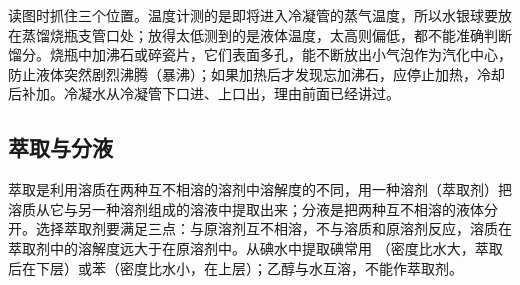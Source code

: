 读图时抓住三个位置。温度计测的是即将进入冷凝管的蒸气温度，所以水银球要放在蒸馏烧瓶支管口处；放得太低测到的是液体温度，太高则偏低，都不能准确判断馏分。烧瓶中加沸石或碎瓷片，它们表面多孔，能不断放出小气泡作为汽化中心，防止液体突然剧烈沸腾（暴沸）；如果加热后才发现忘加沸石，应停止加热，冷却后补加。冷凝水从冷凝管下口进、上口出，理由前面已经讲过。

\subsection{萃取与分液}

萃取是利用溶质在两种互不相溶的溶剂中溶解度的不同，用一种溶剂（萃取剂）把溶质从它与另一种溶剂组成的溶液中提取出来；分液是把两种互不相溶的液体分开。选择萃取剂要满足三点：与原溶剂互不相溶，不与溶质和原溶剂反应，溶质在萃取剂中的溶解度远大于在原溶剂中。从碘水中提取碘常用 （密度比水大，萃取后在下层）或苯（密度比水小，在上层）；乙醇与水互溶，不能作萃取剂。

